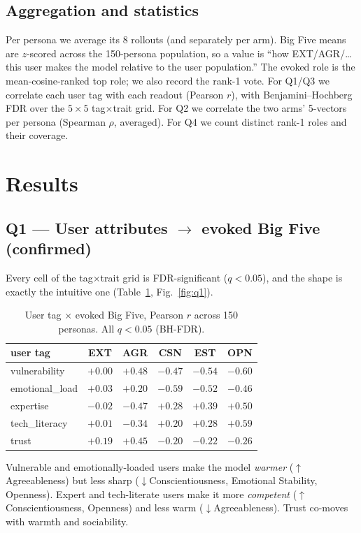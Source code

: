 \documentclass[11pt]{article}
\begin{document}
\subsection{Aggregation and statistics}
Per persona we average its 8 rollouts (and separately per arm). Big Five means are
$z$-scored across the 150-persona population, so a value is ``how EXT/AGR/\ldots
this user makes the model relative to the user population.'' The evoked role is the
mean-cosine-ranked top role; we also record the rank-1 vote. For Q1/Q3 we
correlate each user tag with each readout (Pearson $r$), with Benjamini--Hochberg
FDR over the $5\times5$ tag$\times$trait grid. For Q2 we correlate the two arms'
5-vectors per persona (Spearman $\rho$, averaged). For Q4 we count distinct rank-1
roles and their coverage.

\section{Results}

\subsection{Q1 --- User attributes $\to$ evoked Big Five (confirmed)}
Every cell of the tag$\times$trait grid is FDR-significant ($q<0.05$), and the
shape is exactly the intuitive one (Table~\ref{tab:q1}, Fig.~\ref{fig:q1}).

\begin{table}[h]\centering\small
\caption{User tag $\times$ evoked Big Five, Pearson $r$ across 150 personas. All
$q<0.05$ (BH-FDR).}
\label{tab:q1}
\begin{tabular}{@{}lccccc@{}}
\toprule
user tag & EXT & AGR & CSN & EST & OPN \\
\midrule
vulnerability & $+0.00$ & $\mathbf{+0.48}$ & $-0.47$ & $-0.54$ & $-0.60$ \\
emotional\_load & $+0.03$ & $+0.20$ & $-0.59$ & $-0.52$ & $-0.46$ \\
expertise & $-0.02$ & $\mathbf{-0.47}$ & $+0.28$ & $+0.39$ & $+0.50$ \\
tech\_literacy & $+0.01$ & $-0.34$ & $+0.20$ & $+0.28$ & $+0.59$ \\
trust & $+0.19$ & $+0.45$ & $-0.20$ & $-0.22$ & $-0.26$ \\
\bottomrule
\end{tabular}
\end{table}

\noindent
Vulnerable and emotionally-loaded users make the model \emph{warmer}
($\uparrow$Agreeableness) but less sharp ($\downarrow$Conscientiousness,
Emotional Stability, Openness). Expert and tech-literate users make it more
\emph{competent} ($\uparrow$Conscientiousness, Openness) and less warm
($\downarrow$Agreeableness). Trust co-moves with warmth and sociability.
\end{document}
